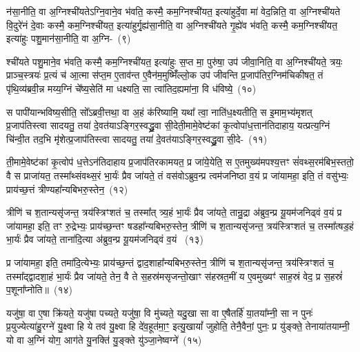 न॑सा॒नीति॒ वा अ॒ग्निश्ची॑यते\-ऽग्नि॒वाने॒व भ॑वति॒ कस्मै॒ कम॒ग्निश्ची॑यत॒ इत्या॑हुर्दे॒वा मा॑ वेद॒न्निति॒ वा अ॒ग्निश्ची॑यते वि॒दुरे॑नं दे॒वाः कस्मै॒ कम॒ग्निश्ची॑यत॒ इत्या॑हुर्गृ॒ह्य॑सा॒नीति॒ वा अ॒ग्निश्ची॑यते गृ॒ह्ये॑व भ॑वति॒ कस्मै॒ कम॒ग्निश्ची॑यत॒ इत्या॑हुः पशु॒मान॑सा॒नीति॒ वा अ॒ग्नि-~(९)\ip

श्ची॑यते पशु॒माने॒व भ॑वति॒ कस्मै॒ कम॒ग्निश्ची॑यत॒ इत्या॑हुः स॒प्त मा॒ पुरु॑षा॒ उप॑ जीवा॒निति॒ वा अ॒ग्निश्ची॑यते॒ त्रयः॒ प्राञ्च॒स्त्रयः॑ प्र॒त्यं च॑ आ॒त्मा स॑प्त॒म ए॒ताव॑न्त ए॒वैन॑म॒मुष्मिँ॑ल्लो॒क उप॑ जीवन्ति प्र॒जा\-प॑तिर॒ग्निम॑चिकीषत॒ तं पृ॑थि॒व्य॑ब्रवी॒न्न मय्य॒ग्निं चे᳚ष्य॒सेति॑ मा धक्ष्यति॒ सा त्वा॑तिद॒ह्यमा॑ना॒ वि ध॑विष्ये॒~(१०)\ip

स पापी॑यान्भविष्य॒सीति॒ सो᳚\-ऽब्रवी॒त्तथा॒ वा अ॒हं क॑रिष्यामि॒ यथा᳚ त्वा॒ नाति॑ध॒क्ष्यतीति॒ स इ॒माम॒भ्य॑मृशत् प्र॒जा\-प॑तिस्त्वा सादयतु॒ तया॑ दे॒वत॑या\-ऽ\-ङ्गिर॒स्वद्ध्रु॒वा सी॒देती॒मामे॒वेष्ट॑कां कृ॒त्वोपा॑ध॒त्तान॑तिदाहाय॒ यत्प्रत्य॒ग्निं चि॑न्वी॒त तद॒भि मृ॑शेत्प्र॒जा\-प॑तिस्त्वा सादयतु॒ तया॑ दे॒वत॑या\-ऽ\-ङ्गिर॒स्वद्ध्रु॒वा सी॒दे-~(११)\ip

ती॒मामे॒वेष्ट॑कां कृ॒त्वोप॑ ध॒त्ते\-ऽन॑तिदाहाय प्र॒जा\-प॑तिरकामयत॒ प्र जा॑ये॒येति॒ स ए॒तमुख्य॑मपश्य॒त्तꣳ सं॑वथ्स॒रम॑बिभ॒स्ततो॒ वै स प्राजा॑यत॒ तस्मा᳚थ्संवथ्स॒रं भा॒र्यः॑ प्रैव जा॑यते॒ तं वस॑वो\-ऽब्रुव॒न्प्र त्वम॑जनिष्ठा व॒यं प्र जा॑यामहा॒ इति॒ तं वसु॑भ्यः॒ प्राय॑च्छ॒त्तं त्रीण्यहा᳚न्यबिभरु॒स्तेन॒~(१२)\ip

त्रीणि॑ च श॒तान्यसृ॑जन्त॒ त्रय॑स्त्रिꣳशतं च॒ तस्मा᳚त् त्र्य॒हं भा॒र्यः॑ प्रैव जा॑यते॒ तान्रु॒द्रा अ॑ब्रुव॒न्प्र यू॒यम॑जनिढ्वं व॒यं प्र जा॑यामहा॒ इति॒ तꣳ रु॒द्रेभ्यः॒ प्राय॑च्छ॒न्तꣳ षडहा᳚न्यबिभरु॒स्तेन॒ त्रीणि॑ च श॒तान्यसृ॑जन्त॒ त्रय॑स्त्रिꣳशतं च॒ तस्मा᳚त्षड॒हं भा॒र्यः॑ प्रैव जा॑यते॒ ताना॑दि॒त्या अ॑ब्रुव॒न्प्र यू॒यम॑जनिढ्वं व॒यं ~(१३)\ip

प्र जा॑यामहा॒ इति॒ तमा॑दि॒त्येभ्यः॒ प्राय॑च्छ॒न्तं द्वाद॒शाहा᳚न्यबिभरु॒स्तेन॒ त्रीणि॑ च श॒तान्यसृ॑जन्त॒ त्रय॑स्त्रिꣳशतं च॒ तस्मा᳚द्\-द्वादशा॒हं भा॒र्यः॑ प्रैव जा॑यते॒ तेन॒ वै ते स॒हस्र॑मसृजन्तो॒खाꣳ स॑हस्रत॒मीं य ए॒वमुख्यꣳ॑ साह॒स्रं वेद॒ प्र स॒हस्रं॑ प॒शूना᳚प्नोति॥~(१४)\ip

{\anuvakamend[{अ॒ग्नि॒वान्प॑शु॒मान॑सा॒नीति॒ वा अ॒ग्निर्ध॑विष्ये मृशेत्प्र॒जा\-प॑तिस्त्वा सादयतु॒ तया॑ दे॒वत॑या\-ऽ\-ङ्गिर॒स्वद्ध्रु॒वा सी॑द॒ तेन॒ ताना॑दि॒त्या अ॑ब्रुव॒न्प्र यू॒यम॑जनिढ्वं व॒यञ्च॑त्वारि॒ꣳ॒शच्च॑}]}

यजु॑षा॒ वा ए॒षा क्रि॑यते॒ यजु॑षा पच्यते॒ यजु॑षा॒ वि मु॑च्यते॒ यदु॒खा सा वा ए॒षैतर्\mbox{}हि॑ या॒तया᳚म्नी॒ सा न पुनः॑ प्र॒युज्येत्या॑हु॒रग्ने॑ यु॒क्ष्वा हि ये तव॑ यु॒क्ष्वा हि दे॑व॒हूत॑मा॒ꣳ॒ इत्यु॒खायां᳚ जुहोति॒ तेनै॒वैनां॒ पुनः॒ प्र यु॑ङ्क्ते॒ तेनाया॑तयाम्नी॒ यो वा अ॒ग्निं योग॒ आग॑ते यु॒नक्ति॑ यु॒ङ्क्ते यु॑ञ्जा॒नेष्वग्ने॑~(१५)\ip

